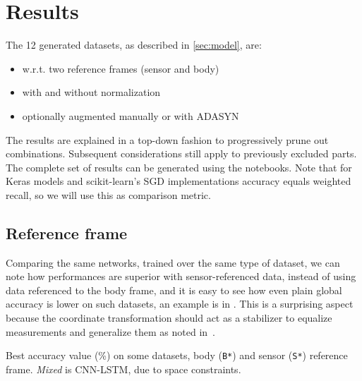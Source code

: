 
\section{Results}\label{sec:results}

The 12 generated datasets, as described in \autoref{sec:model}, are:
\begin{itemize}
    \item w.r.t. two reference frames (sensor and body)
    \item with and without normalization
    \item optionally augmented manually or with ADASYN
\end{itemize}
The results are explained in a top-down fashion to progressively prune out combinations.
Subsequent considerations still apply to previously excluded parts.
The complete set of results can be generated using the notebooks.
Note that for Keras models and scikit-learn's SGD implementations accuracy equals weighted recall, so we will use this as comparison metric.


\subsection{Reference frame}
Comparing the same networks, trained over the same type of dataset, we can note how performances are superior with sensor-referenced data, instead of using data referenced to the body frame, and it is easy to see how even plain global accuracy is lower on such datasets, an example is in .
This is a surprising aspect because the coordinate transformation should act as a stabilizer to equalize measurements and generalize them as noted in~\cite{Liano-HMM}.

\begin{table}[ht]
\centering
\caption{Best accuracy value (\%) on some datasets, body (\texttt{B*}) and sensor (\texttt{S*}) reference frame. \textit{Mixed} is CNN-LSTM, due to space constraints.}
\label{tab:body_sensor}

\end{table}

